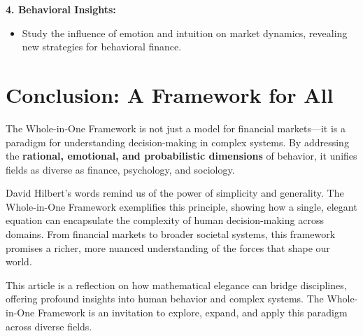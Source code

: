 \documentclass[a4]{article}
\newcommand{\bn}{\bigskip\noindent}
\begin{document}
\bn
 {\bf 4. Behavioral Insights:} 

\begin{itemize}
\item  Study the influence of emotion and intuition on market dynamics, revealing new strategies for behavioral finance.
\end{itemize}


\section{Conclusion: A Framework for All}

The Whole-in-One Framework is not just a model for financial markets---it is a paradigm for understanding decision-making in complex systems. By addressing the {\bf rational, emotional, and probabilistic dimensions}  of behavior, it unifies fields as diverse as finance, psychology, and sociology.

\bn
David Hilbert's words remind us of the power of simplicity and generality. The Whole-in-One Framework exemplifies this principle, showing how a single, elegant equation can encapsulate the complexity of human decision-making across domains. From financial markets to broader societal systems, this framework promises a richer, more nuanced understanding of the forces that shape our world.



\bn {\bf Author's Note}

This article is a reflection on how mathematical elegance can bridge disciplines, offering profound insights into human behavior and complex systems. The Whole-in-One Framework is an invitation to explore, expand, and apply this paradigm across diverse fields.
\end{document}
